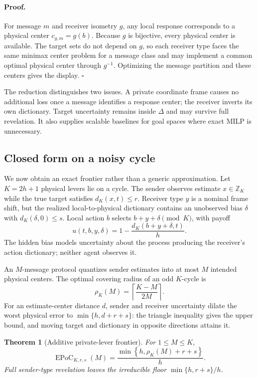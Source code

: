 \documentclass[letterpaper]{article} %
\newtheorem{theorem}{Theorem}
\newcommand{\EPoC}{\operatorname{EPoC}}
\begin{document}
\paragraph{Proof.}
For message $m$ and receiver isometry $g$, any local response corresponds to a
physical center $c_{g,m}=g(b)$. Because $g$ is bijective, every physical center
is available. The target sets do not depend on $g$, so each receiver type faces
the same minimax center problem for a message class and may implement a common
optimal physical center through $g^{-1}$. Optimizing the message partition and
these centers gives the display. \hfill$\square$

The reduction distinguishes two issues. A private coordinate frame causes no
additional loss once a message identifies a response center; the receiver
inverts its own dictionary. Target uncertainty remains inside $\Delta$ and may
survive full revelation. It also supplies scalable baselines for goal spaces
where exact MILP is unnecessary.

\subsection{Closed form on a noisy cycle}
We now obtain an exact frontier rather than a generic approximation. Let
$K=2h+1$ physical levers lie on a cycle. The sender observes estimate
$x\in\mathbb Z_K$ while the true target satisfies $d_K(x,t)\le r$. Receiver
type $y$ is a nominal frame shift, but the realized local-to-physical
dictionary contains an unobserved bias $\delta$ with $d_K(\delta,0)\le s$.
Local action $b$ selects $b+y+\delta\pmod K$, with payoff
\[
u(t,b,y,\delta)=1-\frac{d_K(b+y+\delta,t)}{h}.
\]
The hidden bias models uncertainty about the process producing the receiver's
action dictionary; neither agent observes it.

An $M$-message protocol quantizes sender estimates into at most $M$ intended
physical centers. The optimal covering radius of an odd $K$-cycle is
\[
\rho_K(M)=\left\lceil\frac{K-M}{2M}\right\rceil.
\]
For an estimate-center distance $d$, sender and receiver uncertainty dilate the
worst physical error to $\min\{h,d+r+s\}$: the triangle inequality gives the
upper bound, and moving target and dictionary in opposite directions attains it.

\begin{theorem}[Additive private-lever frontier]\label{thm:lever}
For $1\le M\le K$,
\[
\boxed{\EPoC_{K,r,s}(M)=
\frac{\min\left\{h,\rho_K(M)+r+s\right\}}{h}.}
\]
Full sender-type revelation leaves the irreducible floor
$\min\{h,r+s\}/h$.
\end{theorem}
\end{document}
